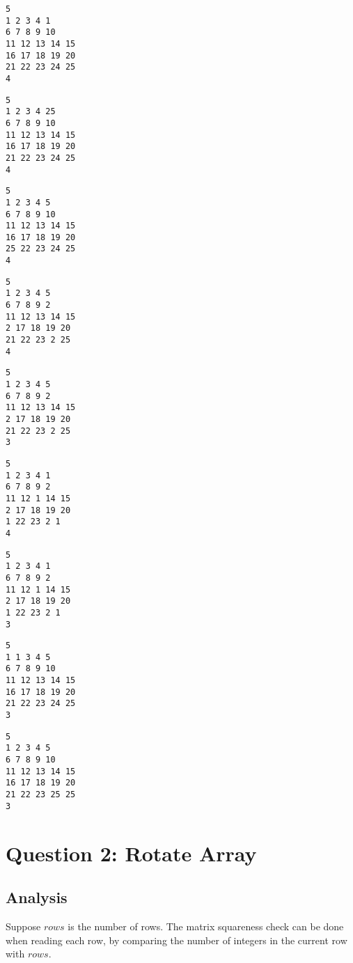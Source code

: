 \begin{lstlisting}[title={<duplicate5-6.txt 20>}, label=Listing20]
5
1 2 3 4 1
6 7 8 9 10
11 12 13 14 15
16 17 18 19 20
21 22 23 24 25
4
\end{lstlisting}
\begin{lstlisting}[title={<duplicate5-7.txt 21>}, label=Listing21]
5
1 2 3 4 25
6 7 8 9 10
11 12 13 14 15
16 17 18 19 20
21 22 23 24 25
4
\end{lstlisting}
\begin{lstlisting}[title={<duplicate5-8.txt 22>}, label=Listing22]
5
1 2 3 4 5
6 7 8 9 10
11 12 13 14 15
16 17 18 19 20
25 22 23 24 25
4
\end{lstlisting}
\begin{lstlisting}[title={<duplicate5-9.txt 23>}, label=Listing23]
5
1 2 3 4 5
6 7 8 9 2
11 12 13 14 15
2 17 18 19 20
21 22 23 2 25
4
\end{lstlisting}
\begin{lstlisting}[title={<duplicate5-10.txt 24>}, label=Listing24]
5
1 2 3 4 5
6 7 8 9 2
11 12 13 14 15
2 17 18 19 20
21 22 23 2 25
3
\end{lstlisting}
\begin{lstlisting}[title={<duplicate5-11.txt 25>}, label=Listing25]
5
1 2 3 4 1
6 7 8 9 2
11 12 1 14 15
2 17 18 19 20
1 22 23 2 1
4
\end{lstlisting}
\begin{lstlisting}[title={<duplicate5-12.txt 26>}, label=Listing26]
5
1 2 3 4 1
6 7 8 9 2
11 12 1 14 15
2 17 18 19 20
1 22 23 2 1
3
\end{lstlisting}\begin{lstlisting}[title={<duplicate5-13.txt 27>}, label=Listing27]
5
1 1 3 4 5
6 7 8 9 10
11 12 13 14 15
16 17 18 19 20
21 22 23 24 25
3
\end{lstlisting}\begin{lstlisting}[title={<duplicate5-14.txt 28>}, label=Listing28]
5
1 2 3 4 5
6 7 8 9 10
11 12 13 14 15
16 17 18 19 20
21 22 23 25 25
3
\end{lstlisting}
\section{Question 2: Rotate Array}

\subsection{Analysis}

Suppose $rows$ is the number of rows. The matrix squareness check can be done
when reading each row, by comparing the number of integers in the current row
with $rows$.

